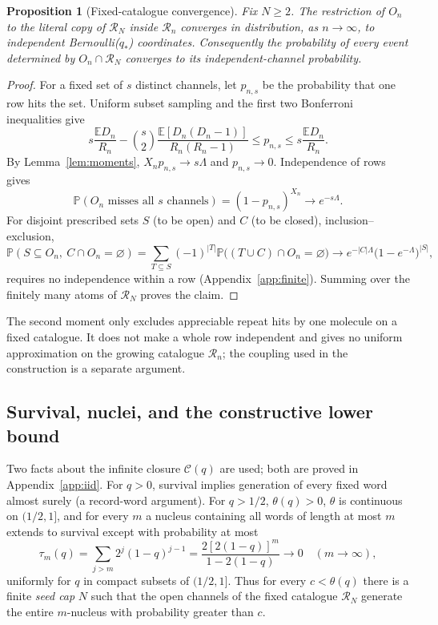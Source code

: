 \documentclass[11pt,letterpaper]{article}
\theoremstyle{plain}
\newtheorem{proposition}[theorem]{Proposition}
\theoremstyle{definition}
\theoremstyle{remark}
\numberwithin{equation}{section}
\newcommand{\PP}{\mathbb P}
\newcommand{\EE}{\mathbb E}
\newcommand{\RR}{\mathcal R}
\newcommand{\cC}{\mathcal C}
\begin{document}
\begin{proposition}[Fixed-catalogue convergence]\label{prop:catalogue}
Fix $N\ge2$. The restriction of $O_n$ to the literal copy of $\RR_N$ inside $\RR_n$ converges in distribution, as $n\to\infty$, to independent Bernoulli($q_*$) coordinates. Consequently the probability of every event determined by $O_n\cap\RR_N$ converges to its independent-channel probability.
\end{proposition}
\begin{proof}
For a fixed set of $s$ distinct channels, let $p_{n,s}$ be the probability that one row hits the set. Uniform subset sampling and the first two Bonferroni inequalities give
\begin{equation}\label{eq:bonf}
 s\frac{\EE D_n}{R_n}-\binom s2\frac{\EE[D_n(D_n-1)]}{R_n(R_n-1)}\le p_{n,s}\le s\frac{\EE D_n}{R_n}.
\end{equation}
By Lemma~\ref{lem:moments}, $X_np_{n,s}\to s\Lambda$ and $p_{n,s}\to0$. Independence of rows gives
\begin{equation}\label{eq:miss}
 \PP(O_n\text{ misses all }s\text{ channels})=(1-p_{n,s})^{X_n}\longrightarrow e^{-s\Lambda}.
\end{equation}
For disjoint prescribed sets $S$ (to be open) and $C$ (to be closed), inclusion--exclusion,
\[
 \PP(S\subseteq O_n,\ C\cap O_n=\varnothing)=\sum_{T\subseteq S}(-1)^{|T|}\PP\bigl((T\cup C)\cap O_n=\varnothing\bigr)\longrightarrow e^{-|C|\Lambda}\bigl(1-e^{-\Lambda}\bigr)^{|S|},
\]
requires no independence within a row (Appendix~\ref{app:finite}). Summing over the finitely many atoms of $\RR_N$ proves the claim.
\end{proof}
The second moment only excludes appreciable repeat hits by one molecule on a fixed catalogue. It does not make a whole row independent and gives no uniform approximation on the growing catalogue $\RR_n$; the coupling used in the construction is a separate argument.

\subsection{Survival, nuclei, and the constructive lower bound}\label{sec:construction}
Two facts about the infinite closure $\cC(q)$ are used; both are proved in Appendix~\ref{app:iid}. For $q>0$, survival implies generation of every fixed word almost surely (a record-word argument). For $q>1/2$, $\theta(q)>0$, $\theta$ is continuous on $(1/2,1]$, and for every $m$ a nucleus containing all words of length at most $m$ extends to survival except with probability at most
\begin{equation}\label{eq:seedtail}
 \tau_m(q)=\sum_{j>m}2^j(1-q)^{j-1}=\frac{2[2(1-q)]^m}{1-2(1-q)}\longrightarrow0\quad(m\to\infty),
\end{equation}
uniformly for $q$ in compact subsets of $(1/2,1]$. Thus for every $c<\theta(q)$ there is a finite \emph{seed cap} $N$ such that the open channels of the fixed catalogue $\RR_N$ generate the entire $m$-nucleus with probability greater than $c$.
\end{document}
